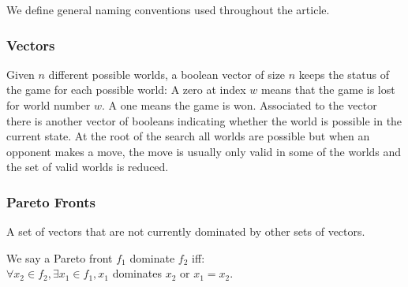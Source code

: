 \documentclass[letterpaper]{article} %
\begin{document}
We define general naming conventions used throughout the article.

\subsubsection{Vectors}

Given $n$ different possible worlds, a boolean vector of size $n$ keeps the status of the game for each possible world: A zero at index $w$ means that the game is lost for world number $w$. A one means the game is won. Associated to the vector there is another vector of booleans indicating whether the world is possible in the current state. At the root of the search all worlds are possible but when an opponent makes a move, the move is usually only valid in some of the worlds and the set of valid worlds is reduced.

\subsubsection{Pareto Fronts}

A set of vectors that are not currently dominated by other sets of vectors.





We say a Pareto front $f_1$ dominate $f_2$ iff:\\


$\forall x_2 \in f_2, \exists x_1 \in f_1, x_1$ dominates $x_2$ or $x_1 = x_2$.\\
\end{document}
